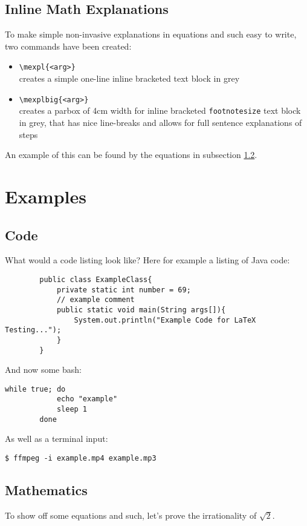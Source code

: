 \documentclass{article}
\begin{document}
    \subsection{Inline Math Explanations}
    To make simple non-invasive explanations in equations and such easy to
    write, two commands have been created: 
    \begin{itemize}
        \item \texttt{\textbackslash mexpl\{<arg>\}} \\ creates a simple
            one-line inline bracketed text block in grey
        \item \texttt{\textbackslash mexplbig\{<arg>\}} \\ creates a parbox of
            4cm width for inline bracketed \texttt{footnotesize} text block in
            grey, that has nice line-breaks and allows for full sentence
            explanations of steps 
    \end{itemize}
    An example of this can be found by the equations in subsection
    \ref{subsec:maths}. 


\section{Examples}
    \subsection{Code}
    What would a code listing look like? Here for example a listing of Java
    code: \begin{lstlisting}
        public class ExampleClass{
            private static int number = 69; 
            // example comment 
            public static void main(String args[]){
                System.out.println("Example Code for LaTeX Testing...");
            }
        }
    \end{lstlisting}

    And now some bash: 
    \begin{lstlisting}[style=bash]
		while true; do
			echo "example" 
			sleep 1
		done
    \end{lstlisting}
    As well as a terminal input: 
    \begin{lstlisting}[style=terminal]
        $ ffmpeg -i example.mp4 example.mp3
    \end{lstlisting}

    \subsection{Mathematics}\label{subsec:maths}
    To show off some equations and such, let's prove the irrationality of
    $\sqrt{2}$. 
\end{document}
